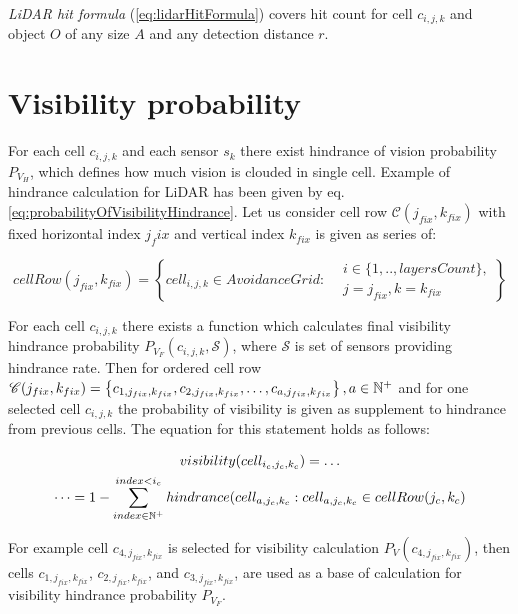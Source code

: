 \noindent \textit{LiDAR hit formula} (\ref{eq:lidarHitFormula}) covers hit count for cell $c_{i,j,k}$ and object $O$ of any size $A$ and any detection distance $r$.

\section{Visibility probability}\label{sec:visibilityProbability}
\noindent For each cell $c_{i,j,k}$ and each sensor $s_k$ there exist hindrance of vision probability $P_{V_H}$, which defines how much vision is clouded in single cell. Example of hindrance calculation for LiDAR has been given by eq. \ref{eq:probabilityOfVisibilityHindrance}. Let us consider cell row $\mathscr{C}(j_{fix},k_{fix})$ with fixed horizontal index $j_fix$ and vertical index $k_{fix}$ is given as series of:

\begin{equation}\label{eq:cellrowDefinition}
    cellRow(j_{fix},k_{fix})= \left\{cell_{i,j,k}\in Avoidance Grid :\begin{aligned}&i\in\{1,..,layersCount\},\\&j=j_{fix}, k=k_{fix}\end{aligned}\right\}
\end{equation}

For each cell $c_{i,j,k}$ there exists a function which calculates final visibility hindrance probability $P_{V_F}(c_{i,j,k},\mathscr{S})$, where $\mathscr{S}$ is set of sensors providing hindrance rate. Then for ordered cell row $\mathscr{C}(j_{fix},k_{fix})=\left\{c_{1,j_{fix},k_{fix}}, c_{2,j_{fix},k_{fix}}, \dots,c_{a,j_{fix},k_{fix}}\right\}, a\in\mathbb{N}^+$ and for one selected cell $c_{i,j,k}$ the probability of visibility is given as supplement to hindrance from previous cells. The equation for this statement holds as follows:

\begin{multline}\label{eq:FinalVisibilityProbability}
    visibility(cell_{i_c,j_c,k_c})=\dots\\ \dots =1 - \sum_{index\in\mathbb{N}^+}^{index < i_c} hindrance(cell_{a,j_c,k_c}: cell_{a,j_c,k_c}\in cell Row(j_{c},k_{c})
\end{multline}

\noindent For example cell $c_{4,j_{fix},k_{fix}}$ is selected for visibility calculation $P_{V}(c_{4,j_{fix},k_{fix}})$, then cells $c_{1,j_{fix},k_{fix}}$, $c_{2,j_{fix},k_{fix}}$, and $c_{3,j_{fix},k_{fix}}$, are used as a base of calculation for visibility hindrance probability $P_{V_F}$.


